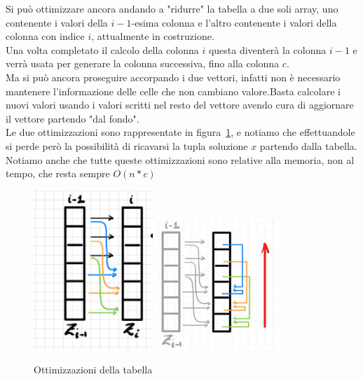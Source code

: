 \documentclass[a4paper]{article}
\begin{document}
Si può ottimizzare ancora andando a "ridurre" la tabella a due soli array, uno contenente i valori della $i-1$-esima colonna e l'altro contenente i valori della colonna con indice $i$, attualmente in costruzione.\\
Una volta completato il calcolo della colonna $i$ questa diventerà la colonna $i-1$ e verrà usata per generare la colonna successiva, fino alla colonna $c$.\\
Ma si può ancora proseguire accorpando i due vettori, infatti non è necessario mantenere l'informazione delle celle che non cambiano valore.Basta calcolare i nuovi valori usando i valori scritti nel resto del vettore avendo cura di aggiornare il vettore partendo "dal fondo".\\
Le due ottimizzazioni sono rappresentate in figura~\ref{FIG:D2_ottimizzazioni}, e notiamo che effettuandole si perde però la possibilità di ricavarsi la tupla soluzione $x$ partendo dalla tabella.
Notiamo anche che tutte queste ottimizzazioni sono relative alla memoria, non al tempo, che resta sempre $O(n*c)$
\begin{figure}[!ht]
\centering
\includegraphics[width=0.4\textwidth]{./img/D2_2vettori}
\includegraphics[width=0.4\textwidth,height=0.32\textheight]{./img/D2_1vettore}
\caption{Ottimizzazioni della tabella} \label{FIG:D2_ottimizzazioni}
\end{figure}\\
\end{document}
